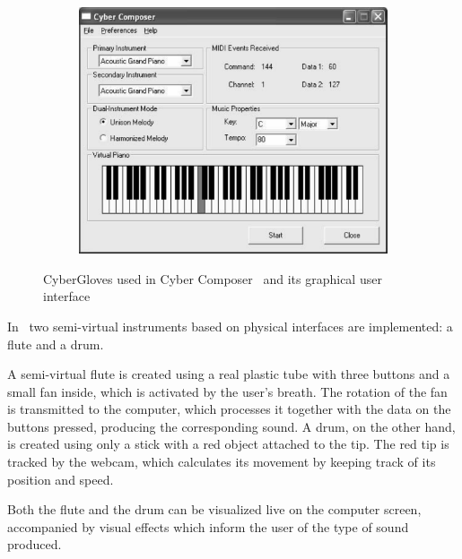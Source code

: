 \begin{figure}[ht]
\begin{subfigure}{0.32\textwidth}
		\includegraphics[width=\textwidth]{images/related-work/cyber-glove-gui}
	\end{subfigure}
	\caption{CyberGloves used in Cyber Composer~\protect\cite{cyber-glove} and its graphical user interface}
	\label{fig:cyber-glove}
\end{figure}

In~\cite{semi-virtual-instruments} two semi-virtual instruments based on physical interfaces are implemented:
a flute and a drum.

A semi-virtual flute is created using a real plastic tube with three buttons and a small fan inside,
which is activated by the user's breath.
The rotation of the fan is transmitted to the computer, which processes it together with the data on the buttons pressed,
producing the corresponding sound.
A drum, on the other hand, is created using only a stick with a red object attached to the tip.
The red tip is tracked by the webcam, which calculates its movement by keeping track of its position and speed.

Both the flute and the drum can be visualized live on the computer screen, accompanied by visual effects
which inform the user of the type of sound produced.

